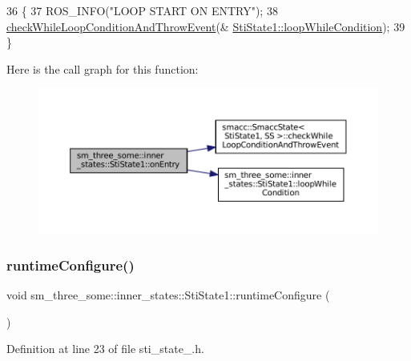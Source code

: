 \begin{DoxyCode}
36   \{
37     ROS\_INFO(\textcolor{stringliteral}{"LOOP START ON ENTRY"});
38     \hyperlink{classsmacc_1_1SmaccState_a80082718f226bebedb589f0c4696001d}{checkWhileLoopConditionAndThrowEvent}(&
      \hyperlink{structsm__three__some_1_1inner__states_1_1StiState1_aa57c154b9243b49328c11ba48c5d9779}{StiState1::loopWhileCondition});
39   \}
\end{DoxyCode}
Here is the call graph for this function\+:
\nopagebreak
\begin{figure}[H]
\begin{center}
\leavevmode
\includegraphics[width=350pt]{structsm__three__some_1_1inner__states_1_1StiState1_a678a34ba0258c496f873012299e65b98_cgraph}
\end{center}
\end{figure}
\mbox{\label{structsm__three__some_1_1inner__states_1_1StiState1_aa21f1eeac8b6c9685ad9a01aebc939aa}} 
\subsubsection{\texorpdfstring{runtime\+Configure()}{runtimeConfigure()}}
{\footnotesize\ttfamily void sm\+\_\+three\+\_\+some\+::inner\+\_\+states\+::\+Sti\+State1\+::runtime\+Configure (\begin{DoxyParamCaption}{ }\end{DoxyParamCaption})\hspace{0.3cm}{\ttfamily [inline]}}



Definition at line 23 of file sti\+\_\+state\+\_.\+h.


